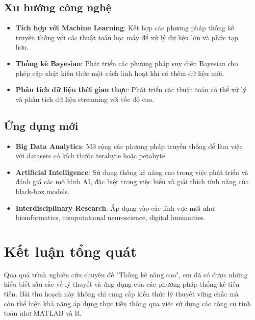 \subsection*{Xu hướng công nghệ}

\begin{itemize}
    \item \textbf{Tích hợp với Machine Learning}: Kết hợp các phương pháp thống kê truyền thống với các thuật toán học máy để xử lý dữ liệu lớn và phức tạp hơn.
    
    \item \textbf{Thống kê Bayesian}: Phát triển các phương pháp suy diễn Bayesian cho phép cập nhật kiến thức một cách linh hoạt khi có thêm dữ liệu mới.
    
    \item \textbf{Phân tích dữ liệu thời gian thực}: Phát triển các thuật toán có thể xử lý và phân tích dữ liệu streaming với tốc độ cao.
\end{itemize}

\subsection*{Ứng dụng mới}

\begin{itemize}
    \item \textbf{Big Data Analytics}: Mở rộng các phương pháp truyền thống để làm việc với datasets có kích thước terabyte hoặc petabyte.
    
    \item \textbf{Artificial Intelligence}: Sử dụng thống kê nâng cao trong việc phát triển và đánh giá các mô hình AI, đặc biệt trong việc hiểu và giải thích tính năng của black-box models.
    
    \item \textbf{Interdisciplinary Research}: Áp dụng vào các lĩnh vực mới như bioinformatics, computational neuroscience, digital humanities.
\end{itemize}

\section*{Kết luận tổng quát}

Qua quá trình nghiên cứu chuyên đề "Thống kê nâng cao", em đã có được những hiểu biết sâu sắc về lý thuyết và ứng dụng của các phương pháp thống kê tiên tiến. Bài thu hoạch này không chỉ cung cấp kiến thức lý thuyết vững chắc mà còn thể hiện khả năng áp dụng thực tiễn thông qua việc sử dụng các công cụ tính toán như MATLAB và R.

